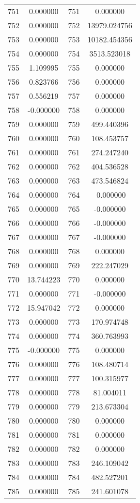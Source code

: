 \documentclass[12pt]{article}
\begin{document}
\begin{longtable}{@{}cccc@{}}
751 & 0.000000 & 751 & 0.000000 \\
752 & 0.000000 & 752 & 13979.024756 \\
753 & 0.000000 & 753 & 10182.454356 \\
754 & 0.000000 & 754 & 3513.523018 \\
755 & 1.109995 & 755 & 0.000000 \\
756 & 0.823766 & 756 & 0.000000 \\
757 & 0.556219 & 757 & 0.000000 \\
758 & -0.000000 & 758 & 0.000000 \\
759 & 0.000000 & 759 & 499.440396 \\
760 & 0.000000 & 760 & 108.453757 \\
761 & 0.000000 & 761 & 274.247240 \\
762 & 0.000000 & 762 & 404.536528 \\
763 & 0.000000 & 763 & 473.546824 \\
764 & 0.000000 & 764 & -0.000000 \\
765 & 0.000000 & 765 & -0.000000 \\
766 & 0.000000 & 766 & -0.000000 \\
767 & 0.000000 & 767 & -0.000000 \\
768 & 0.000000 & 768 & 0.000000 \\
769 & 0.000000 & 769 & 222.247029 \\
770 & 13.744223 & 770 & 0.000000 \\
771 & 0.000000 & 771 & -0.000000 \\
772 & 15.947042 & 772 & 0.000000 \\
773 & 0.000000 & 773 & 170.974748 \\
774 & 0.000000 & 774 & 360.763993 \\
775 & -0.000000 & 775 & 0.000000 \\
776 & 0.000000 & 776 & 108.480714 \\
777 & 0.000000 & 777 & 100.315977 \\
778 & 0.000000 & 778 & 81.004011 \\
779 & 0.000000 & 779 & 213.673304 \\
780 & 0.000000 & 780 & 0.000000 \\
781 & 0.000000 & 781 & 0.000000 \\
782 & 0.000000 & 782 & 0.000000 \\
783 & 0.000000 & 783 & 246.109042 \\
784 & 0.000000 & 784 & 482.527201 \\
785 & 0.000000 & 785 & 241.601078 \\

\end{longtable}
\end{document}
